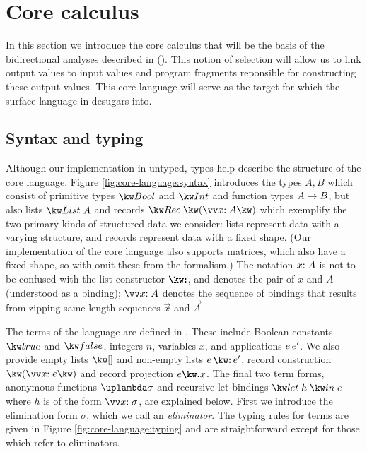 \section{Core calculus}
\label{sec:core-language}

In this section we introduce the core calculus that will be the basis of the bidirectional analyses described in (). This notion of selection will allow us to link output values to input values and program fragments reponsible for constructing these output values. This core language will serve as the target for which the surface language in  desugars into.

\subsection{Syntax and typing}
\label{sec:core-language:syntax-typing}

Although our implementation in untyped, types help describe the structure of the core language.
Figure \ref{fig:core-language:syntax} introduces the types $A, B$ which consist of primitive types $\tyBool$ and $\tyInt$ and function types ${A}\rightarrow{B}$, but also lists $\tyList{A}$ and records $\tyRec{\vec{\bind{x}{A}}}$ which exemplify the two primary kinds of structured data we consider: lists represent data with a varying structure, and records represent data with a fixed shape. (Our implementation of the core language also supports matrices, which also have a fixed shape, so with omit these from the formalism.) The notation $x{:}\;A$ is not to be confused with the list constructor $\symCons$, and denotes the pair of $x$ and $A$ (understood as a binding); $\seq{\bind{x}{A}}$ denotes the sequence of bindings that results from zipping same-length sequences $\vec{x}$ and $\vec{A}$.



The terms of the language are defined in . These include Boolean constants $\exTrue$ and $\exFalse$, integers $n$, variables $x$, and applications ${e}\,{e'}$. We also provide empty lists $\exNil$ and non-empty lists $\exCons{e}{e'}$, record construction $\exRec{\vec{\bind{x}{e}}}$ and record projection $\exRecProj{e}{x}$. The final two term forms, anonymous functions $\exLambda{\sigma}$ and recursive let-bindings $\exLetRecMutual{h}{e}$ where $h$ is of the form $\vec{\bind{x}{\sigma}}$, are explained below. First we introduce the elimination form $\sigma$, which we call an \emph{eliminator}. The typing rules for terms are given in Figure \ref{fig:core-language:typing} and are straightforward except for those which refer to eliminators.

